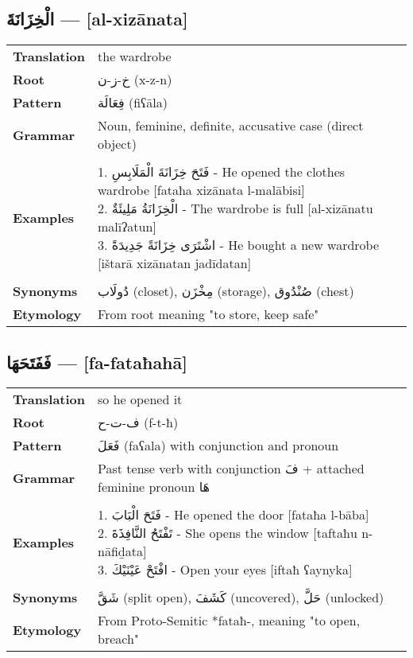 \documentclass[letter,12pt]{article}
\begin{document}
\subsection{\textarabic{الْخِزَانَةَ} — [al-xizānata]}
\begin{tabular}{p{3cm}p{10cm}}
\toprule
\textbf{Translation} & the wardrobe \\
\textbf{Root} & \textarabic{خ-ز-ن} (x-z-n) \\
\textbf{Pattern} & \textarabic{فِعَالَة} (fiʕāla) \\
\textbf{Grammar} & Noun, feminine, definite, accusative case (direct object) \\
\midrule \\
\textbf{Examples} & \makecell[l]{\parbox{9.5cm}{
1. \textarabic{فَتَحَ خِزَانَةَ الْمَلَابِسِ} - He opened the clothes wardrobe [fataħa xizānata l-malābisi]\\
2. \textarabic{الْخِزَانَةُ مَلِيئَةٌ} - The wardrobe is full [al-xizānatu malīʔatun]\\
3. \textarabic{اشْتَرَى خِزَانَةً جَدِيدَةً} - He bought a new wardrobe [ištarā xizānatan jadīdatan]
}} \\
\midrule \\
\textbf{Synonyms} & \textarabic{دُولَاب} (closet), \textarabic{مِخْزَن} (storage), \textarabic{صُنْدُوق} (chest) \\
\textbf{Etymology} & From root meaning "to store, keep safe" \\
\bottomrule
\end{tabular}

\subsection{\textarabic{فَفَتَحَهَا} — [fa-fataħahā]}
\begin{tabular}{p{3cm}p{10cm}}
\toprule
\textbf{Translation} & so he opened it \\
\textbf{Root} & \textarabic{ف-ت-ح} (f-t-ħ) \\
\textbf{Pattern} & \textarabic{فَعَلَ} (faʕala) with conjunction and pronoun \\
\textbf{Grammar} & Past tense verb with conjunction \textarabic{فَ} + attached feminine pronoun \textarabic{هَا} \\
\midrule \\
\textbf{Examples} & \makecell[l]{\parbox{9.5cm}{
1. \textarabic{فَتَحَ الْبَابَ} - He opened the door [fataħa l-bāba]\\
2. \textarabic{تَفْتَحُ النَّافِذَةَ} - She opens the window [taftaħu n-nāfiḏata]\\
3. \textarabic{افْتَحْ عَيْنَيْكَ} - Open your eyes [iftaħ ʕaynyka]
}} \\
\midrule \\
\textbf{Synonyms} & \textarabic{شَقَّ} (split open), \textarabic{كَشَفَ} (uncovered), \textarabic{حَلَّ} (unlocked) \\
\textbf{Etymology} & From Proto-Semitic *fataħ-, meaning "to open, breach" \\
\bottomrule
\end{tabular}
\end{document}
